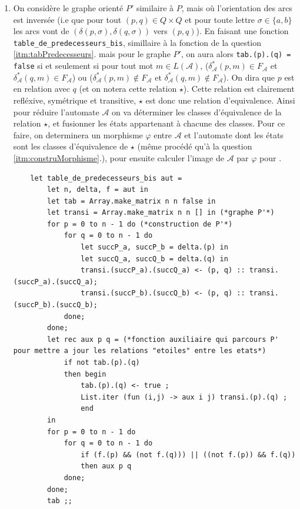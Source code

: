 \documentclass{article}
\begin{document}
\begin{enumerate}
    \item On considère le graphe orienté $P'$ similaire à $P$, mais où l'orientation des arcs est inversée (i.e que pour tout $(p, q) \in Q \times Q$ et pour toute lettre $\sigma \in \{a , b \}$ les arcs vont de $(\delta(p, \sigma), \delta(q, \sigma))$ vers $(p, q)$). En faisant une fonction \verb|table_de_predecesseurs_bis|, simillaire à la fonction de la question \ref{itm:tabPredecesseurs}. mais pour le graphe $P'$, on aura alors \verb|tab.(p).(q) = false|  si et seulement si pour tout mot $m \in L(\mathcal{A})$, ($\delta_\mathcal{A}^*(p, m) \in F_\mathcal{A}$ et $\delta_\mathcal{A}^*(q, m) \in F_\mathcal{A}$) ou ($\delta_\mathcal{A}^*(p, m) \notin F_\mathcal{A}$ et $\delta_\mathcal{A}^*(q, m) \notin F_\mathcal{A}$). On dira que $p$ est en relation avec $q$ (et on notera cette relation $\star$). \newline
    Cette relation est clairement refléxive, symétrique et transitive, $\star$ est donc une relation d'equivalence. Ainsi pour réduire l'automate $\mathcal{A}$ on va déterminer les classes d'équivalence de la relation $\star$, et fusionner les états appartenant à chacune des classes. Pour ce faire, on determinera un morphisme $\varphi$ entre $\mathcal{A}$ et l'automate dont les états sont les classes d'équivalence de $\star$ (même procédé qu'à la question \ref{itm:construMorphisme}.), pour ensuite calculer l'image de $\mathcal{A}$ par $\varphi$ pour .

    \begin{verbatim}
    let table_de_predecesseurs_bis aut = 
        let n, delta, f = aut in
        let tab = Array.make_matrix n n false in
        let transi = Array.make_matrix n n [] in (*graphe P'*)
        for p = 0 to n - 1 do (*construction de P'*)
            for q = 0 to n - 1 do
                let succP_a, succP_b = delta.(p) in
                let succQ_a, succQ_b = delta.(q) in
                transi.(succP_a).(succQ_a) <- (p, q) :: transi.(succP_a).(succQ_a);
                transi.(succP_b).(succQ_b) <- (p, q) :: transi.(succP_b).(succQ_b);
            done;
        done;
        let rec aux p q = (*fonction auxiliaire qui parcours P' pour mettre a jour les relations "etoiles" entre les etats*)
            if not tab.(p).(q)
            then begin
                tab.(p).(q) <- true ; 
                List.iter (fun (i,j) -> aux i j) transi.(p).(q) ;
                end
        in
        for p = 0 to n - 1 do 
            for q = 0 to n - 1 do
                if (f.(p) && (not f.(q))) || ((not f.(p)) && f.(q))
                then aux p q
            done;
        done;
        tab ;;


\end{verbatim}
\end{enumerate}
\end{document}
